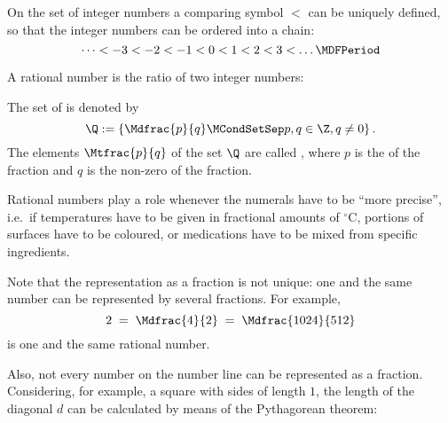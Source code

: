 \begin{MIntro}
\begin{center}
\end{center}

On the set of integer numbers a comparing symbol $<$ can be uniquely defined, so that the integer numbers can be ordered into a chain:
$$\dots < -3 < -2 < -1 < 0 < 1 < 2 < 3 < \dots \MDFPeriod$$

\newpage
A rational number is the ratio of two integer numbers:

\begin{MInfo}
The set of  is denoted by
$$\Q:=\left\{{\Mdfrac{p}{q}\MCondSetSep p,q\in\Z, q\neq 0 }\right\}.$$
The elements $\displaystyle \Mtfrac{p}{q}$ of the set $\Q$ are called , where $p$ is the 
 of the fraction and $q$ is the non-zero  of the fraction.
\end{MInfo}
Rational numbers play a role whenever the numerals have to be ``more precise'', i.e.\ if temperatures 
have to be given in fractional amounts of $^\circ$C, portions of surfaces have to be coloured, or medications have to be 
mixed from specific ingredients. 

Note that the representation as a fraction is not unique: one and the same number can be 
represented by several fractions. For example,
$$
2 \;=\; \Mdfrac{4}{2} \;=\; \Mdfrac{1024}{512}
$$
is one and the same rational number.

Also, not every number on the number line can be represented as a fraction. Considering, for example, 
a square with sides of length $1$, the length of the diagonal $d$ can be calculated by means of the 
Pythagorean theorem:

\vspace*{5mm}


\end{MIntro}
